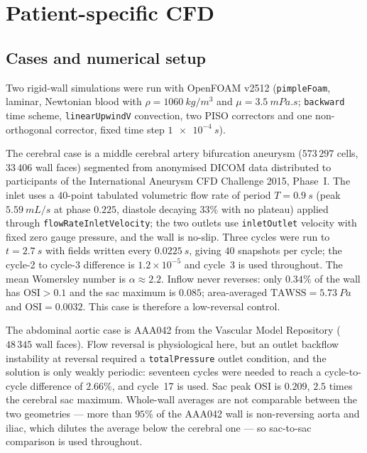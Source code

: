 \documentclass[11pt,a4paper]{article}
\newcommand{\TAWSS}{\mathrm{TAWSS}}
\newcommand{\OSI}{\mathrm{OSI}}
\begin{document}
\section{Patient-specific CFD}
\label{sec:cfd}

\subsection{Cases and numerical setup}

Two rigid-wall simulations were run with OpenFOAM v2512 (\texttt{pimpleFoam},
laminar, Newtonian blood with $\rho=\SI{1060}{kg/m^3}$ and
$\mu=\SI{3.5}{mPa.s}$; \texttt{backward} time scheme,
\texttt{linearUpwindV} convection, two PISO correctors and one
non-orthogonal corrector, fixed time step $\SI{1e-4}{s}$).

The cerebral case is a middle cerebral artery bifurcation aneurysm
($573\,297$ cells, $33\,406$ wall faces) segmented from anonymised DICOM data
distributed to participants of the International Aneurysm CFD Challenge
2015, Phase~I. The inlet uses a $40$-point tabulated volumetric flow rate of
period $T=\SI{0.9}{s}$ (peak $\SI{5.59}{mL/s}$ at phase $0.225$, diastole
decaying $33\%$ with no plateau) applied through
\texttt{flowRateInletVelocity}; the two outlets use \texttt{inletOutlet}
velocity with fixed zero gauge pressure, and the wall is no-slip. Three
cycles were run to $t=\SI{2.7}{s}$ with fields written every
$\SI{0.0225}{s}$, giving $40$ snapshots per cycle; the cycle-2 to cycle-3
difference is $1.2\times10^{-5}$ and cycle~3 is used throughout. The mean
Womersley number is $\alpha\approx2.2$. Inflow never reverses: only $0.34\%$
of the wall has $\OSI>0.1$ and the sac maximum is $0.085$; area-averaged
$\TAWSS=\SI{5.73}{Pa}$ and $\OSI=0.0032$. This case is therefore a
low-reversal control.

The abdominal aortic case is AAA042 from the Vascular Model Repository
($48\,345$ wall faces). Flow reversal is physiological here, but an outlet
backflow instability at reversal required a \texttt{totalPressure} outlet
condition, and the solution is only weakly periodic: seventeen cycles were
needed to reach a cycle-to-cycle difference of $2.66\%$, and cycle~17 is
used. Sac peak $\OSI$ is $0.209$, $2.5$ times the cerebral sac maximum.
Whole-wall averages are not comparable between the two geometries --- more
than $95\%$ of the AAA042 wall is non-reversing aorta and iliac, which
dilutes the average below the cerebral one --- so sac-to-sac comparison is
used throughout.
\end{document}

